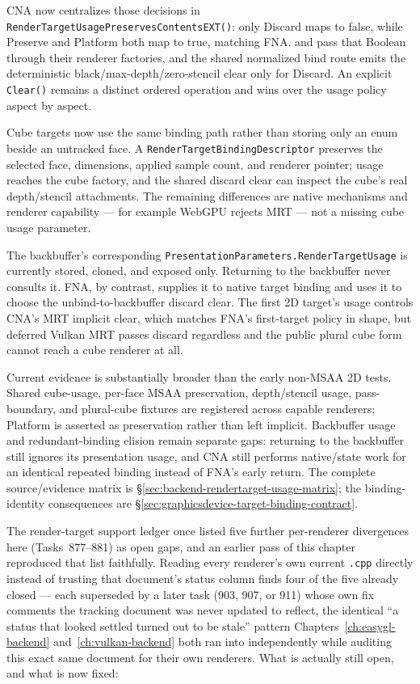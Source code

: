 CNA now centralizes those decisions in
\texttt{RenderTargetUsagePreservesContentsEXT()}: only Discard maps to false, while Preserve
and Platform both map to true, matching FNA.  and
 pass that Boolean through their renderer factories, and the shared
normalized bind route emits the deterministic black/max-depth/zero-stencil clear only for
Discard. An explicit \texttt{Clear()} remains a distinct ordered operation and wins over the
usage policy aspect by aspect.

Cube targets now use the same binding path rather than storing only an enum beside an
untracked face. A \texttt{RenderTargetBindingDescriptor} preserves the selected face,
dimensions, applied sample count, and renderer pointer; usage reaches the cube factory, and
the shared discard clear can inspect the cube's real depth/stencil attachments. The remaining
differences are native mechanisms and renderer capability --- for example WebGPU rejects MRT
--- not a missing cube usage parameter.

The backbuffer's corresponding
\texttt{PresentationParameters.RenderTargetUsage} is currently stored, cloned, and exposed
only. Returning to the backbuffer never consults it. FNA, by contrast, supplies it to native
target binding and uses it to choose the unbind-to-backbuffer discard clear. The first 2D
target's usage controls CNA's MRT implicit clear, which matches FNA's first-target policy in
shape, but deferred Vulkan MRT passes discard regardless and the public plural cube form
cannot reach a cube renderer at all.

Current evidence is substantially broader than the early non-MSAA 2D tests. Shared cube-usage,
per-face MSAA preservation, depth/stencil usage, pass-boundary, and plural-cube fixtures are
registered across capable renderers; Platform is asserted as preservation rather than left
implicit. Backbuffer usage and redundant-binding elision remain separate gaps: returning to
the backbuffer still ignores its presentation usage, and CNA still performs native/state work
for an identical repeated binding instead of FNA's early return. The complete source/evidence matrix is
\S\ref{sec:backend-rendertarget-usage-matrix}; the binding-identity consequences are
\S\ref{sec:graphicsdevice-target-binding-contract}.

The render-target support ledger once listed five further per-renderer divergences here
(Tasks~877--881) as open gaps, and an earlier pass of this chapter reproduced that list
faithfully. Reading every renderer's own current \texttt{.cpp} directly instead of trusting that
document's status column finds four of the five already closed --- each superseded by a later
task (903, 907, or 911) whose own fix comments the tracking document
was never updated to reflect, the identical ``a status that looked settled turned out to be
stale'' pattern Chapters~\ref{ch:easygl-backend} and~\ref{ch:vulkan-backend} both ran into
independently while auditing this exact same document for their own renderers. What is actually
still open, and what is now fixed:

